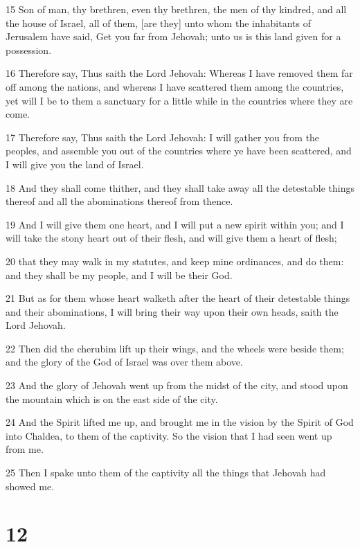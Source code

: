 \par 15 Son of man, thy brethren, even thy brethren, the men of thy kindred, and all the house of Israel, all of them, [are they] unto whom the inhabitants of Jerusalem have said, Get you far from Jehovah; unto us is this land given for a possession.
\par 16 Therefore say, Thus saith the Lord Jehovah: Whereas I have removed them far off among the nations, and whereas I have scattered them among the countries, yet will I be to them a sanctuary for a little while in the countries where they are come.
\par 17 Therefore say, Thus saith the Lord Jehovah: I will gather you from the peoples, and assemble you out of the countries where ye have been scattered, and I will give you the land of Israel.
\par 18 And they shall come thither, and they shall take away all the detestable things thereof and all the abominations thereof from thence.
\par 19 And I will give them one heart, and I will put a new spirit within you; and I will take the stony heart out of their flesh, and will give them a heart of flesh;
\par 20 that they may walk in my statutes, and keep mine ordinances, and do them: and they shall be my people, and I will be their God.
\par 21 But as for them whose heart walketh after the heart of their detestable things and their abominations, I will bring their way upon their own heads, saith the Lord Jehovah.
\par 22 Then did the cherubim lift up their wings, and the wheels were beside them; and the glory of the God of Israel was over them above.
\par 23 And the glory of Jehovah went up from the midst of the city, and stood upon the mountain which is on the east side of the city.
\par 24 And the Spirit lifted me up, and brought me in the vision by the Spirit of God into Chaldea, to them of the captivity. So the vision that I had seen went up from me.
\par 25 Then I spake unto them of the captivity all the things that Jehovah had showed me.

\chapter{12}

